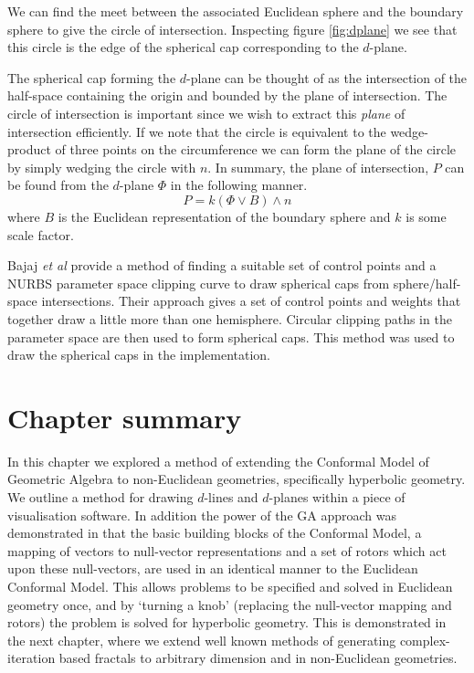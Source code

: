 We can find the meet between the associated Euclidean sphere and the
boundary sphere to give the circle of intersection. Inspecting figure
\ref{fig:dplane} we
see that this circle is the edge of the spherical
cap corresponding to the $d$-plane.

The spherical cap forming the $d$-plane can be thought of as the
intersection of the half-space containing the origin and bounded
by the plane of intersection.
The circle of intersection is important since we wish to extract
this \emph{plane} of intersection efficiently. 
If we note that the circle is equivalent to the wedge-product of three
points on the circumference we can form the plane of the circle
by simply wedging the circle with $n$. In summary,
the plane of intersection, $P$ can be found from the $d$-plane $\Phi$ in
the following manner.
\[
P = k (\Phi \vee B) \wedge n
\]
where $B$ is the Euclidean representation of the boundary sphere
and $k$ is some scale factor.


Bajaj \emph{et al}\cite{spherecap} provide a method of finding
a suitable set of control points and a NURBS parameter space clipping
curve to draw spherical caps from sphere/half-space intersections.
Their approach gives a set of control points and weights that together
draw a little more than one hemisphere. Circular clipping paths in the 
parameter space are then used to form spherical caps.
This method was used to draw the spherical caps in the implementation.


\section{Chapter summary}

In this chapter we explored a method of extending the Conformal Model
of Geometric Algebra to non-Euclidean geometries, specifically hyperbolic geometry. We
outline a method for drawing $d$-lines and $d$-planes within a piece of
visualisation software. In addition the power of the GA approach was demonstrated
in that the basic building blocks of the Conformal Model, a mapping of vectors
to null-vector representations and a set of rotors which act upon these
null-vectors, are used in an identical manner to the Euclidean Conformal Model.
This allows problems to be specified and solved in Euclidean geometry 
once, and by `turning a knob' (replacing the null-vector mapping and rotors) the
problem is solved for hyperbolic geometry. This is demonstrated in the next
chapter, where we extend well known methods of generating complex-iteration
based fractals to arbitrary dimension and in non-Euclidean geometries.

